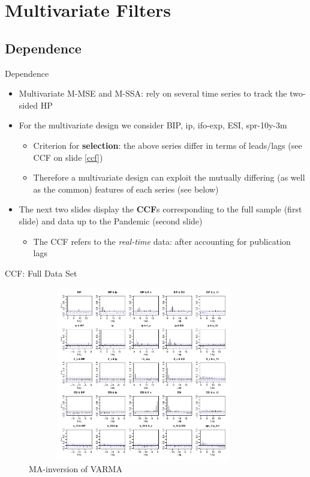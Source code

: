 \documentclass{beamer}
\begin{document}
\section{Multivariate Filters}

\frame{\sectionpage}












\subsection{Dependence}


\begin{frame} {Dependence}
\begin{itemize}
\item Multivariate M-MSE and M-SSA: rely on several time series to track the two-sided HP 
\item For the multivariate design we consider BIP, ip, ifo-exp, ESI, spr-10y-3m
\begin{itemize}
\item Criterion for \textbf{selection}: the above series differ in terms of leads/lags (see CCF on slide \eqref{ccf}) \item Therefore a multivariate design can exploit  the mutually differing (as well as the common) features of each series (see below) 
\end{itemize}
\item The next two slides display the \textbf{CCF}s corresponding to the full sample (first slide) and data up to the Pandemic (second slide) 
\begin{itemize}
\item The CCF refers to the \emph{real-time} data: after accounting for publication lags
\end{itemize}
\end{itemize}

\end{frame}


\begin{frame} {CCF: Full Data Set}\label{ccf_pand_multe}
\begin{figure}[H]\begin{center}\includegraphics[height=3in, width=4in]{acf_all.pdf}\caption{MA-inversion of VARMA\label{cor}}\end{center}\end{figure}\end{frame}
\end{document}

